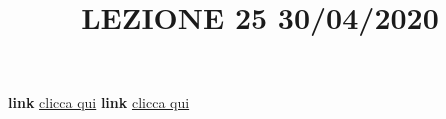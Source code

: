 \newline
\newline
\title{LEZIONE 25 30/04/2020}\newline
\textbf{link} \href{https://web.microsoftstream.com/video/e16da4d9-2d8f-4820-8bd0-d1e9096fd676?list=user&userId=faa91214-a6f5-40d7-8875-253fd49b8ce1}{clicca qui}\newline
\textbf{link} \href{https://web.microsoftstream.com/video/34f9791f-e6fa-4a81-865b-d8349d7dcd43?list=user&userId=faa91214-a6f5-40d7-8875-253fd49b8ce1}{clicca qui}